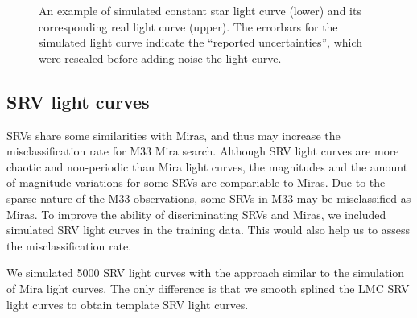 \begin{figure}
\caption{An example of simulated constant star light curve (lower) and its corresponding real light curve (upper). The errorbars for the simulated light curve indicate the ``reported uncertainties'', which were rescaled before adding noise the light curve.}\label{fig.const.flc.example}
\end{figure}

\subsection{SRV light curves}

SRVs share some similarities with Miras, and thus may increase the misclassification rate for M33 Mira search. Although SRV light curves are more chaotic and non-periodic than Mira light curves, the magnitudes and the amount of magnitude variations for some SRVs are compariable to Miras. Due to the sparse nature of the M33 observations, some SRVs in M33 may be misclassified as Miras. To improve the ability of discriminating SRVs and Miras, we included simulated SRV light curves in the training data. This would also help us to assess the misclassification rate.

We simulated 5000 SRV light curves with the approach similar to the simulation of Mira light curves. The only difference is that we smooth splined the LMC SRV light curves to obtain template SRV light curves.
